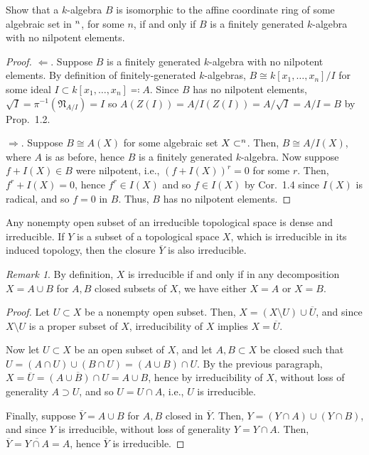 \documentclass[10pt]{article}
\theoremstyle{definition}
\theoremstyle{remark}
\newtheorem*{remark}{Remark}
\numberwithin{equation}{section}
\numberwithin{figure}{subsubsection}
\let\AA\relax
\DeclareMathOperator{\AA}{\mathbf{A}}
\begin{document}
\begin{problem}
  Show that a $k$-algebra $B$ is isomorphic to the affine coordinate ring of
  some algebraic set in $\AA^n$, for some $n$, if and only if $B$ is a
  finitely generated $k$-algebra with no nilpotent elements.
\end{problem}
\begin{proof}
  $\Leftarrow$. Suppose $B$ is a finitely generated $k$-algebra with no
  nilpotent elements.
  By definition of finitely-generated $k$-algebras,
  $B \cong k[x_1,\ldots,x_n]/I$ for some ideal
  $I \subset k[x_1,\ldots,x_n] \eqqcolon A$.
  Since $B$ has no nilpotent elements,
  $\sqrt{I} = \pi^{-1}(\mathfrak{N}_{A/I}) = I$ so
  $A(Z(I)) = A/I(Z(I)) = A/\sqrt{I} = A/I = B$ by Prop.~1.2.
  \par $\Rightarrow$. Suppose $B \cong A(X)$ for some algebraic set
  $X \subset \AA^n$.
  Then, $B \cong A/I(X)$, where $A$ is as before, hence $B$ is a finitely
  generated $k$-algebra.
  Now suppose $f + I(X) \in B$ were nilpotent, i.e., $(f + I(X))^r = 0$ for
  some $r$.
  Then, $f^r + I(X) = 0$, hence $f^r \in I(X)$ and so $f \in I(X)$ by
  Cor.~1.4 since $I(X)$ is radical, and so $f = 0$ in $B$.
  Thus, $B$ has no nilpotent elements.
\end{proof}

\begin{problem}\label{exc:I.1.6}
  Any nonempty open subset of an irreducible topological space is dense and
  irreducible.
  If $Y$ is a subset of a topological space $X$, which is irreducible in its
  induced topology, then the closure $\overline{Y}$ is also irreducible.
\end{problem}
\begin{remark}
  By definition, $X$ is irreducible if and only if in any decomposition
  $X = A \cup B$ for $A,B$ closed subsets of $X$, we have either $X = A$ or
  $X = B$.
\end{remark}
\begin{proof}
  Let $U \subset X$ be a nonempty open subset.
  Then, $X = (X \setminus U) \cup \overline{U}$, and since $X \setminus U$ is
  a proper subset of $X$, irreducibility of $X$ implies $X = \overline{U}$.
  \par Now let $U \subset X$ be an open subset of $X$, and let $A,B \subset X$
  be closed such that $U = (A \cap U) \cup (B \cap U) = (A \cup B) \cap U$.
  By the previous paragraph,
  $X = \overline{U} = \overline{(A \cup B) \cap U} = A \cup B$, hence by
  irreducibility of $X$, without loss of generality $A \supset U$, and so
  $U = U \cap A$, i.e., $U$ is irreducible.
  \par Finally, suppose $\overline{Y} = A \cup B$ for $A,B$ closed in
  $\overline{Y}$.
  Then, $Y = (Y \cap A) \cup (Y \cap B)$, and since $Y$ is irreducible, without
  loss of generality $Y = Y \cap A$.
  Then, $\overline{Y} = \overline{Y \cap A} = A$, hence $\overline{Y}$ is
  irreducible.
\end{proof}
\end{document}
